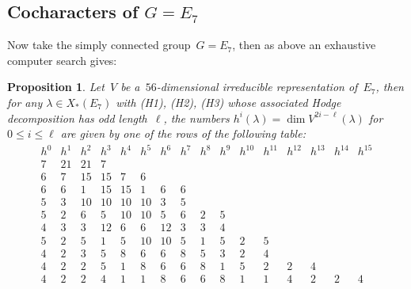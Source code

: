 \documentclass[a4paper]{amsart}
\renewcommand{\le}{\leqslant}
\theoremstyle{plain}
\newtheorem{proposition}[theorem]{Proposition}
\theoremstyle{definition}
\numberwithin{equation}{section}
\begin{document}
\subsection{Cocharacters of \texorpdfstring{$G=E_7$}{G=E{7}}}

Now take the simply connected group~$G=E_7$, then as above an exhaustive computer search gives:

\begin{proposition} \label{prop:E7}
Let~$V$ be a~$56$-dimensional irreducible representation of~$E_7$, then for any $\lambda \in X_\ast(E_7)$ with (H1), (H2), (H3) whose associated Hodge decomposition has odd length~$\ell$, the numbers
%
$h^i(\lambda) =\dim V^{2i-\ell}(\lambda)$
for~$0\le i\le \ell$ are given by one of the rows of the following table:
%
\[
\begin{array}{c|c|c|c|c|c|c|c|c|c|c|c|c|c|c|c}
 h^0 & h^1 & h^2 & h^3 & h^4 & h^5 & h^6 & h^7 & h^8 & h^9 & h^{10} & h^{11} & h^{12} & h^{13} & h^{14} & h^{15} \\
\hline
 7 & 21 & 21 & 7 &&&&&&&&&&&&\\
 6 & 7 & 15 & 15 & 7 & 6&&&&&&&&&&\\
 6 & 6 & 1 & 15 & 15 & 1 & 6 & 6 &&&&&&&& \\
 5 & 3 & 10 & 10 & 10 & 10 & 3 & 5&&&&&&&&\\
 5 & 2 & 6 & 5 & 10 & 10 & 5 & 6 & 2 & 5 &&&&&& \\
 4 & 3 & 3 & 12 & 6 & 6 & 12 & 3 & 3 & 4 &&&&&&\\
 5 & 2 & 5 & 1 & 5 & 10 & 10 & 5 & 1 & 5 & 2 & 5 &&&&\\
 4 & 2 & 3 & 5 & 8 & 6 & 6 & 8 & 5 & 3 & 2 & 4 &&& \\
 4 & 2 & 2 & 5 & 1 & 8 & 6 & 6 & 8 & 1 & 5 & 2 & 2 & 4 &\\
 4 & 2 & 2 & 4 & 1 & 1 & 8 & 6 & 6 & 8 & 1 & 1 & 4 & 2 & 2 & 4 \\
\end{array}
\]
\end{proposition}
\end{document}
